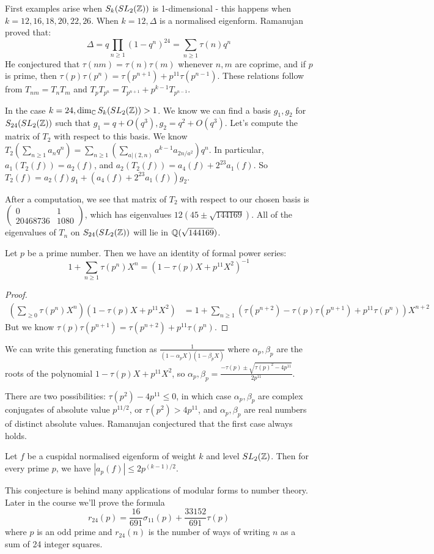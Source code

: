 \documentclass[10pt,a4paper]{article}
\begin{document}
First examples arise when $S_k(SL_2(\mathbb{Z}))$ is 1-dimensional - this happens when $k=12,16,18,20,22,26$. When $k=12, \Delta$ is a normalised eigenform. Ramanujan proved that:
\[\Delta = q \prod_{n\geq 1}(1-q^n)^{24} = \sum_{n\geq 1}\tau(n) q^n\]
He conjectured that $\tau(nm) = \tau(n)\tau(m)$ whenever $n,m$ are coprime, and if $p$ is prime, then $\tau(p)\tau(p^n) = \tau(p^{n+1}) + p^{11}\tau(p^{n-1})$. These relations follow from $T_{nm} = T_nT_m$ and $T_p T_{p^n} = T_{p^{n+1}}+p^{k-1}T_{p^{n-1}}$.

In the case $k=24, \dim_{\mathbb{C}}S_k(SL_2(\mathbb{Z})) > 1$. We know we can find a basis $g_1, g_2$ for $S_{24}(SL_2(\mathbb{Z}))$ such that $g_1 = q + O(q^3), g_2 = q^2 + O(q^3)$. Let's compute the matrix of $T_2$ with respect to this basis. We know $T_2(\sum_{n\geq 1}a_nq^n) = \sum_{n\geq 1}\left(\sum_{a|(2,n)}a^{k-1}a_{2n/a^2}\right)q^n$. In particular, $a_1(T_2(f)) = a_2(f)$, and $a_2(T_2(f)) = a_4(f) + 2^{23}a_1(f)$. So $T_2(f) = a_2(f)g_1 + (a_4(f)+2^{23}a_1(f))g_2$.

After a computation, we see that matrix of $T_2$ with respect to our chosen basis is $\begin{pmatrix} 0 & 1 \\ 20468736 & 1080 \end{pmatrix}$, which has eigenvalues $12(45 \pm \sqrt{144169})$. All of the eigenvalues of $T_n$ on $S_{24}(SL_2(\mathbb{Z}))$ will lie in $\mathbb{Q}(\sqrt{144169})$.

\begin{lemma}
  Let $p$ be a prime number. Then we have an identity of formal power series:
  \[1+\sum_{n\geq 1} \tau(p^n)X^n = (1-\tau(p)X+p^{11}X^2)^{-1}\]
\end{lemma}
\begin{proof}
  \begin{align*}
    \left(\sum_{\geq 0}\tau(p^n)X^n\right)(1-\tau(p) X + p^{11}X^2) &= 1+ \sum_{n \geq 1} \left(\tau(p^{n+2}) - \tau(p)\tau(p^{n+1})+p^{11} \tau(p^n)\right)X^{n+2}
  \end{align*}
  But we know $\tau(p)\tau(p^{n+1}) = \tau(p^{n+2}) + p^{11}\tau(p^n)$.
\end{proof}
We can write this generating function as $\frac{1}{(1-\alpha_p X)(1-\beta_p X)}$ where $\alpha_p, \beta_p$ are the roots of the polynomial $1-\tau(p)X + p^{11}X^2$, so $\alpha_p, \beta_p = \frac{-\tau(p)\pm \sqrt{\tau(p)^2-4p^{11}}}{2p^{11}}$.

There are two possibilities: $\tau(p^{2}) - 4p^{11} \leq 0$, in which case $\alpha_p, \beta_p$ are complex conjugates of absolute value $p^{11/2}$, or $\tau(p^2) > 4p^{11}$, and $\alpha_p, \beta_p$ are real numbers of distinct absolute values. Ramanujan conjectured that the first case always holds.
\begin{conjecture}
  Let $f$ be a cuspidal normalised eigenform of weight $k$ and level $SL_2(\mathbb{Z})$. Then for every prime $p$, we have $|a_p(f)| \leq 2p^{(k-1)/2}$.
\end{conjecture}
This conjecture is behind many applications of modular forms to number theory. Later in the course we'll prove the formula
\[r_{24}(p) = \frac{16}{691}\sigma_{11}(p) + \frac{33152}{691}\tau(p)\]
where $p$ is an odd prime and $r_{24}(n)$ is the number of ways of writing $n$ as a sum of 24 integer squares.
\end{document}
